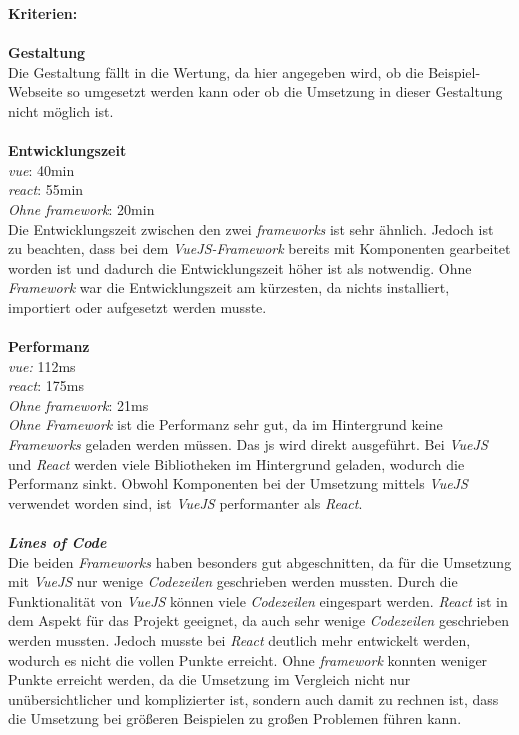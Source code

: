 \textbf{Kriterien:}\\\\
\textbf{Gestaltung}\\
Die Gestaltung fällt in die Wertung, da hier angegeben wird, ob die Beispiel-Webseite so umgesetzt werden kann oder ob die Umsetzung in dieser Gestaltung nicht möglich ist.\\\\
\newpage
\textbf{Entwicklungszeit}\\
\textit{\Gls{vue}}: 40min\\
\textit{\Gls{react}}: 55min\\
\textit{Ohne \Gls{framework}}: 20min\\
Die Entwicklungszeit zwischen den zwei \textit{\Gls{framework}s} ist sehr ähnlich. Jedoch ist zu beachten, dass bei dem \textit{VueJS-Framework} bereits mit Komponenten gearbeitet worden ist und dadurch die Entwicklungszeit höher ist als notwendig. Ohne \textit{Framework} war die Entwicklungszeit am kürzesten, da nichts installiert, importiert oder aufgesetzt werden musste.\\\\
\textbf{Performanz}\\
\textit{\Gls{vue}:} 112ms\\
\textit{\Gls{react}}: 175ms\\
\textit{Ohne \Gls{framework}}: 21ms\\
\textit{Ohne Framework} ist die Performanz sehr gut, da im Hintergrund keine \textit{Frameworks} geladen werden müssen. Das \Gls{js} wird direkt ausgeführt. Bei \textit{VueJS} und \textit{React} werden viele Bibliotheken im Hintergrund geladen, wodurch die Performanz sinkt. Obwohl Komponenten bei der Umsetzung mittels \textit{VueJS} verwendet worden sind, ist \textit{VueJS} performanter als \textit{React}.\\\\
\textit{\textbf{Lines of Code}}\\
Die beiden \textit{Frameworks} haben besonders gut abgeschnitten, da für die Umsetzung mit \textit{VueJS} nur wenige \textit{Codezeilen} geschrieben werden mussten. Durch die Funktionalität von \textit{VueJS} können viele \textit{Codezeilen} eingespart werden. \textit{React} ist in dem Aspekt für das Projekt geeignet, da auch sehr wenige \textit{Codezeilen} geschrieben werden mussten. Jedoch musste bei \textit{React} deutlich mehr entwickelt werden, wodurch es nicht die vollen Punkte erreicht.
Ohne \textit{\Gls{framework}} konnten weniger Punkte erreicht werden, da die Umsetzung im Vergleich nicht nur unübersichtlicher und komplizierter ist, sondern auch damit zu rechnen ist, dass die Umsetzung bei größeren Beispielen zu großen Problemen führen kann.
\newpage
